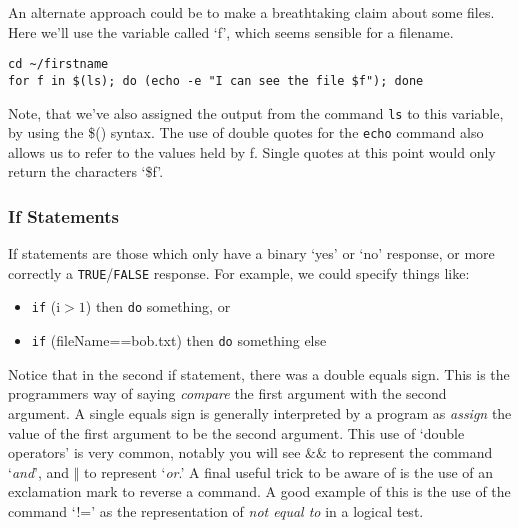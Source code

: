 \begin{advanced}
An alternate approach could be to make a breathtaking claim about some files.
Here we'll use the variable called `f', which seems sensible for a filename.
\begin{lstlisting}
cd ~/firstname
for f in $(ls); do (echo -e "I can see the file $f"); done
\end{lstlisting}
\end{advanced}

Note, that we've also assigned the output from the command \texttt{ls} to this variable, by using the \$() syntax.
The use of double quotes for the \texttt{echo} command also allows us to refer to the values held by f.
Single quotes at this point would only return the characters `\$f'.

\subsubsection{If Statements}
If statements are those which only have a binary `yes' or `no' response, or more correctly a \texttt{TRUE}/\texttt{FALSE} response.
For example, we could specify things like:
\begin{itemize}
\item \texttt{if} (i$>1$) then \texttt{do} something, or
\item \texttt{if} (fileName==bob.txt) then \texttt{do} something else
\end{itemize}

\begin{information}
Notice that in the second if statement, there was a double equals sign.
This is the programmers way of saying \textit{compare} the first argument with the second argument.
A single equals sign is generally interpreted by a program as \textit{assign} the value of the first argument to be the second argument.
This use of `double operators' is very common, notably you will see \&\& to represent the command `\textit{and}', and $\Vert$ to represent `\textit{or}.'
A final useful trick to be aware of is the use of an exclamation mark to reverse a command.
A good example of this is the use of the command `!=' as the representation of \textit{not equal to} in a logical test.
\end{information}

